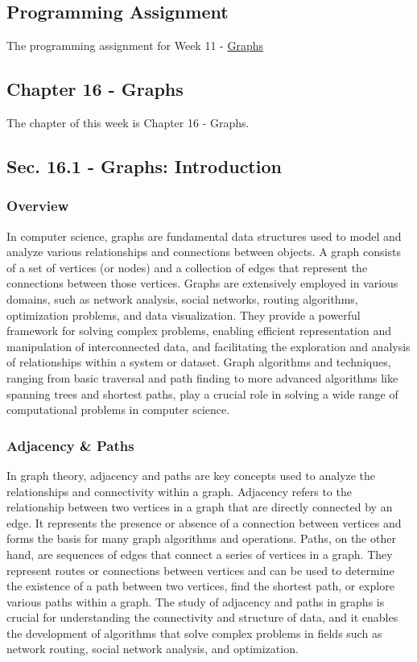 \subsection{Programming Assignment}

The programming assignment for Week 11 - \href{https://github.com/cu-cspb-2270-Summer-2023/pa9-RelativiBit}{Graphs}

\subsection{Chapter 16 - Graphs}

The chapter of this week is Chapter 16 - Graphs.

\subsection*{Sec. 16.1 - Graphs: Introduction}

\subsubsection{Overview}

In computer science, graphs are fundamental data structures used to model and analyze various relationships and connections between objects. A graph consists of a set of vertices (or nodes) and a 
collection of edges that represent the connections between those vertices. Graphs are extensively employed in various domains, such as network analysis, social networks, routing algorithms, 
optimization problems, and data visualization. They provide a powerful framework for solving complex problems, enabling efficient representation and manipulation of interconnected data, and 
facilitating the exploration and analysis of relationships within a system or dataset. Graph algorithms and techniques, ranging from basic traversal and path finding to more advanced algorithms like 
spanning trees and shortest paths, play a crucial role in solving a wide range of computational problems in computer science.

\subsubsection{Adjacency \& Paths}

In graph theory, adjacency and paths are key concepts used to analyze the relationships and connectivity within a graph. Adjacency refers to the relationship between two vertices in a graph that are 
directly connected by an edge. It represents the presence or absence of a connection between vertices and forms the basis for many graph algorithms and operations. Paths, on the other hand, are sequences 
of edges that connect a series of vertices in a graph. They represent routes or connections between vertices and can be used to determine the existence of a path between two vertices, find the shortest 
path, or explore various paths within a graph. The study of adjacency and paths in graphs is crucial for understanding the connectivity and structure of data, and it enables the development of algorithms 
that solve complex problems in fields such as network routing, social network analysis, and optimization.

